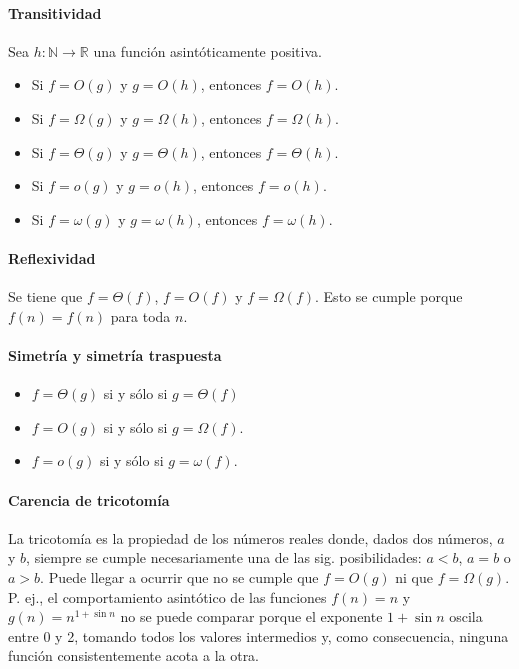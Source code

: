 \paragraph{Transitividad} 
  Sea \(h:\mathbb{N}\to\mathbb{R}\) una función asintóticamente positiva.
  \begin{itemize}
    \item Si \(f=O(g)\) y \(g=O(h)\), entonces \(f=O(h)\).
    \item Si \(f=\Omega(g)\) y \(g=\Omega(h)\), entonces \(f=\Omega(h)\).
    \item Si \(f=\Theta(g)\) y \(g=\Theta(h)\), entonces \(f=\Theta(h)\).
    \item Si \(f=o(g)\) y \(g=o(h)\), entonces \(f=o(h)\).
    \item Si \(f=\omega(g)\) y \(g=\omega(h)\), entonces \(f=\omega(h)\).
  \end{itemize}

\paragraph{Reflexividad} 
  Se tiene que \(f=\Theta(f)\), \(f=O(f)\) y \(f=\Omega(f)\). 
  Esto se cumple porque \(f(n)=f(n)\) para toda \(n\).

\paragraph{Simetría y simetría traspuesta}
  \begin{itemize}
    \item \(f=\Theta(g)\) si y sólo si \(g=\Theta(f)\)
    \item \(f=O(g)\) si y sólo si \(g=\Omega(f)\).
    \item \(f=o(g)\) si y sólo si \(g=\omega(f)\).
  \end{itemize}

\paragraph{Carencia de tricotomía} 
  La tricotomía es la propiedad de los números reales donde, dados dos números, \(a\) y \(b\), siempre se cumple necesariamente una de las sig. posibilidades: \(a<b\), \(a=b\) o \(a>b\).
  Puede llegar a ocurrir que no se cumple que \(f=O(g)\) ni que \(f=\Omega(g)\).
  P. ej., el comportamiento asintótico de las funciones \(f(n)=n\) y \(g(n)=n^{1+\sin{n}}\) no se puede comparar porque el exponente \(1+\sin{n}\) oscila entre 0 y 2, tomando todos los valores intermedios y, como consecuencia, ninguna función consistentemente acota a la otra.

